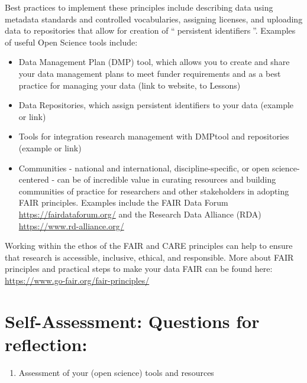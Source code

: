\documentclass[
  letterpaper,
  DIV=11,
  numbers=noendperiod]{scrreport}
\providecommand{\tightlist}{%
  \setlength{\itemsep}{0pt}\setlength{\parskip}{0pt}}\usepackage{longtable,booktabs,array}
\begin{document}
Best practices to implement these principles include describing data
using metadata standards and controlled vocabularies, assigning
licenses, and uploading data to repositories that allow for creation of
``📖{persistent identifiers📖}''. Examples of useful Open Science tools
include:

\begin{itemize}
\tightlist
\item
  Data Management Plan (DMP) tool, which allows you to create and share
  your data management plans to meet funder requirements and as a best
  practice for managing your data (link to website, to Lessons)
\item
  Data Repositories, which assign persistent identifiers to your data
  (example or link)
\item
  Tools for integration research management with DMPtool and
  repositories (example or link)
\item
  Communities - national and international, discipline-specific, or open
  science-centered - can be of incredible value in curating resources
  and building communities of practice for researchers and other
  stakeholders in adopting FAIR principles. Examples include the FAIR
  Data Forum \url{https://fairdataforum.org/} and the Research Data
  Alliance (RDA) \url{https://www.rd-alliance.org/}
\end{itemize}

Working within the ethos of the FAIR and CARE principles can help to
ensure that research is accessible, inclusive, ethical, and responsible.
More about FAIR principles and practical steps to make your data FAIR
can be found here: \url{https://www.go-fair.org/fair-principles/}

\hypertarget{self-assessment-questions-for-reflection}{%
\section*{Self-Assessment: Questions for
reflection:}\label{self-assessment-questions-for-reflection}}


\begin{enumerate}
\def\labelenumi{\arabic{enumi}.}
\tightlist
\item
  Assessment of your (open science) tools and resources
\end{enumerate}
\end{document}
